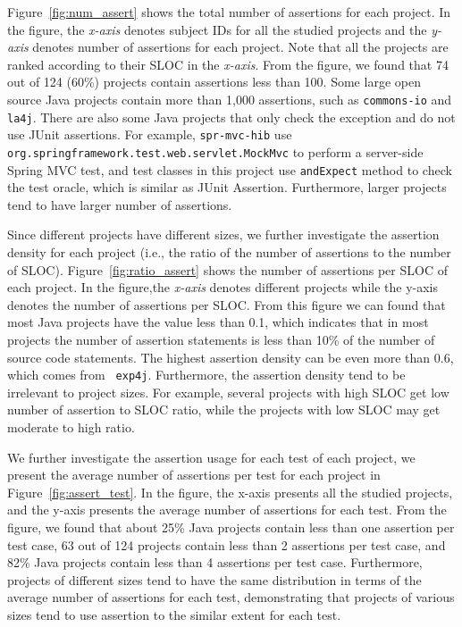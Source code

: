 Figure~\ref{fig:num_assert} shows the total number of assertions for
each project. In the figure, the {\em x-axis} denotes subject IDs for
all the studied projects and the {\em y-axis} denotes number of
assertions for each project. Note that all the projects are ranked
according to their SLOC in the {\em x-axis}.  From the figure, we
found that 74 out of 124 (60\%) projects contain assertions less than
100. Some large open source Java projects contain more than 1,000
assertions, such as {\tt commons-io} and {\tt la4j}.  There are also some
Java projects that only check the exception and do not use JUnit
assertions. For example, {\tt spr-mvc-hib} use {\tt
org.springframework.test.web.servlet.MockMvc} to perform a server-side
Spring MVC test, and test classes in this project use {\tt andExpect}
method to check the test oracle, which is similar as JUnit
Assertion. Furthermore, larger projects tend to have larger number of
assertions. 

Since different projects have different sizes, we further investigate
the assertion density for each project (i.e., the ratio of the number
of assertions to the number of SLOC). Figure~\ref{fig:ratio_assert}
shows the number of assertions per SLOC of each project. In the
figure,the {\em x-axis} denotes different projects while the {y-axis}
denotes the number of assertions per SLOC. From this figure we can
found that most Java projects have the value less than 0.1, which
indicates that in most projects the number of assertion statements is
less than 10\% of the number of source code statements. The highest
assertion density can be even more than 0.6, which comes from {\tt
exp4j}. Furthermore, the assertion density tend to be irrelevant to
project sizes. For example, several projects with high SLOC get low
number of assertion to SLOC ratio, while the projects with low SLOC
may get moderate to high ratio. 

We further investigate the assertion usage for each test of each
project, we present the average number of assertions per test for each
project in Figure~\ref{fig:assert_test}. In the figure, the {x-axis}
presents all the studied projects, and the {y-axis} presents the
average number of assertions for each test. From the figure, we found
that about 25\% Java projects contain less than one assertion per test
case, 63 out of 124 projects contain less than 2 assertions per test
case, and 82\% Java projects contain less than 4 assertions per test
case.  Furthermore, projects of different sizes tend to have the same
distribution in terms of the average number of assertions for each
test, demonstrating that projects of various sizes tend to use
assertion to the similar extent for each test. 


